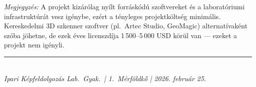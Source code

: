\documentclass[12pt,a4paper]{article}
\begin{document}
\vspace{0.5em}
\noindent\textit{Megjegyzés:} A projekt kizárólag nyílt forráskódú szoftvereket és a laboratóriumi infrastruktúrát vesz igénybe, ezért a tényleges projektköltség minimális. Kereskedelmi 3D szkenner szoftver (pl.\ Artec Studio, GeoMagic) alternatívaként szóba jöhetne, de ezek éves licenszdíja 1\,500--5\,000 USD körül van --- ezeket a projekt nem igényli.

\vspace{2em}
\noindent\rule{\textwidth}{0.4pt}\\
\small\textit{Ipari Képfeldolgozás Lab.\ Gyak.\ | 1.\ Mérföldkő | 2026. február 25.}
\end{document}
